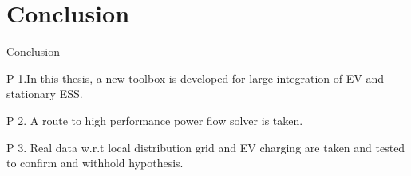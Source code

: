 \documentclass[aspectratio=169]{beamer}
\begin{document}
\section{Conclusion}
\begin{frame}{Conclusion}
 \begin{block}{P 1.}In this thesis, a new toolbox is developed for large integration of EV and stationary ESS.\end{block}
 \begin{block}{P 2.} A route to high performance power flow solver is taken. \end{block}
 \begin{block}{P 3.} Real data w.r.t local distribution grid and EV charging are taken and tested to confirm and withhold hypothesis. \end{block}
\end{frame}
\end{document}
